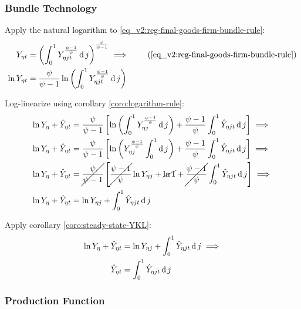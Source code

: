 \documentclass[../thesis.tex]{subfiles}
\begin{document}

	\subsubsection*{Bundle Technology}

Apply the natural logarithm to \ref{eq_v2:reg-final-goods-firm-bundle-rule}:
\begin{align}
	Y_{\eta t} &= \left( \int_{0}^{1} Y_{\eta jt}^{\frac{\psi-1}{\psi}} \dif j \right)^{\frac{\psi}{\psi-1}} \implies  \tag{\ref{eq_v2:reg-final-goods-firm-bundle-rule}} \\
	\ln{Y_{\eta t}} &= {\frac{\psi}{\psi-1}} \ln{\left( \int_{0}^{1} Y_{\eta jt}^{\frac{\psi-1}{\psi}} \dif j \right)} \nonumber
\end{align}

Log-linearize using corollary \ref{coro:logarithm-rule}:
\begin{align}
	\ln{Y_{\eta}} + \hat{Y}_{\eta t} &= \frac{\psi}{\psi-1} \left[ \ln \left( \int_{0}^{1} Y_{\eta j}^{\frac{\psi-1}{\psi}} \operatorname{d} j \right) + \frac{\psi-1}{\psi} \int_{0}^{1} \hat{Y}_{\eta jt} \operatorname{d} j \right] \implies \nonumber
	\\
	\ln{Y_{\eta}} + \hat{Y}_{\eta t} &= \frac{\psi}{\psi-1} \left[ \ln \left( Y_{\eta j}^{\frac{\psi-1}{\psi}} \int_{0}^{1} \operatorname{d} j \right) + \frac{\psi-1}{\psi} \int_{0}^{1} \hat{Y}_{\eta jt} \operatorname{d} j \right] \implies \nonumber
	\\
	\ln{Y_{\eta}} + \hat{Y}_{\eta t} &= \cancel{\frac{\psi}{\psi-1}} \left[ \cancel{\frac{\psi-1}{\psi}} \ln{Y_{\eta j}} + \cancel{\ln1} + \cancel{\frac{\psi-1}{\psi}} \int_{0}^{1} \hat{Y}_{\eta jt} \operatorname{d} j \right] \implies \nonumber
	\\
	\ln{Y_{\eta}} + \hat{Y}_{\eta t} &= \ln{Y_{\eta j}} + \int_{0}^{1} \hat{Y}_{\eta jt} \operatorname{d} j \nonumber
\end{align}

Apply corollary \ref{coro:steady-state-YKL}:
\begin{align}
	\ln{Y_{\eta}} + \hat{Y}_{\eta t} &= \ln{Y_{\eta j}} + \int_{0}^{1} \hat{Y}_{\eta jt} \operatorname{d} j \implies \nonumber \\
	\hat{Y}_{\eta t} &= \int_{0}^{1} \hat{Y}_{\eta jt} \operatorname{d} j 
	\label{eq_v2:reg-ll-final-goods-firm-bundle-rule}
\end{align}


\subsubsection*{Production Function}
\end{document}
